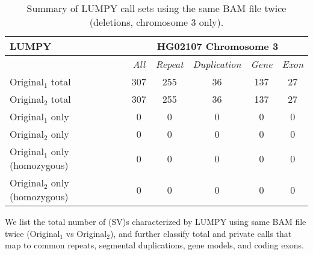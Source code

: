 \begin{table}[htb]
\caption{ Summary of LUMPY call sets using the same BAM file twice (deletions, chromosome 3 only). }
\begin{center}
\begin{tabular}{|l|c||c|c|c|c|}
\hline
{\bf LUMPY} & \multicolumn{5}{|c|}{\bf HG02107 Chromosome 3} \\
\hline
\cline{2-6}
{\bf} & {\it All} & {\it Repeat} & {\it Duplication} & {\it Gene} & {\it Exon} \\
\hline
Original$_1$ total & 307 & 255 & 36 & 137 & 27 \\
\hline
Original$_2$ total & 307 & 255 & 36 & 137 & 27 \\
\hline
Original$_1$ only & 0 & 0 & 0 & 0 & 0\\ 
\hline
Original$_2$ only & 0 & 0 & 0 & 0 & 0\\
\hline
Original$_1$ only (homozygous) & 0 & 0 & 0 & 0 & 0\\ 
\hline
Original$_2$ only (homozygous) & 0 & 0 & 0 & 0 & 0\\  
\hline
\end{tabular}
\end{center}
{\footnotesize We list the total number of (SV)s characterized by LUMPY using same BAM file twice (Original$_1$ vs Original$_2$), 
and further classify total and private calls that map to common repeats, segmental duplications, gene models, and coding exons.}
\label{supptab:orig-vs-orig2-lumpy}
\end{table}

